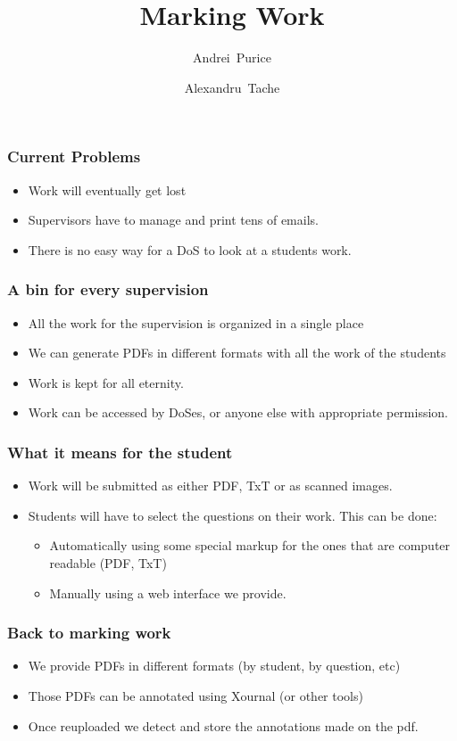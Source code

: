 \documentclass{beamer}
\title %
{Marking Work}
\author[Author, Anders] %
{Andrei~Purice \and Alexandru~Tache}
\begin{document}
	\frame{\titlepage}
	\begin{frame}
    	\frametitle{Current Problems}
 
   	   	\begin{itemize}
   	   		\item Work will eventually get lost
   	   		\item Supervisors have to manage and print tens of emails.
   	   		\item There is no easy way for a DoS to look at a students work.
  	   	 \end{itemize}	   	 
  	\end{frame}
  	
  	\begin{frame}
    	\frametitle{A bin for every supervision}
    	\begin{itemize}
    		\item All the work for the supervision is organized in a single place
    	    \item We can generate PDFs in different formats with all the work of the students  
    		\item Work is kept for all eternity. 
    		\item Work can be accessed by DoSes, or anyone else with appropriate permission.
    	\end{itemize}
    \end{frame}
    \begin{frame}
    	\frametitle{What it means for the student}
    	\begin{itemize}
    		\item Work will be submitted as either PDF, TxT or as scanned images.
    		\item Students will have to select the questions on their work. This can be done:
    		\begin{itemize}
    			\item Automatically using some special markup for the ones that are computer readable (PDF, TxT)
    			\item Manually using a web interface we provide.    			\end{itemize}
    	\end{itemize}    	
    \end{frame}
    
    \begin{frame}
    	\frametitle{Back to marking work}
    	\begin{itemize}
    		\item We provide PDFs in different formats (by student, by question, etc)
    		\item Those PDFs can be annotated using Xournal (or other tools)
    		\item Once reuploaded we detect and store the annotations made on the pdf.
    	\end{itemize}
    \end{frame}
    
\end{document}
